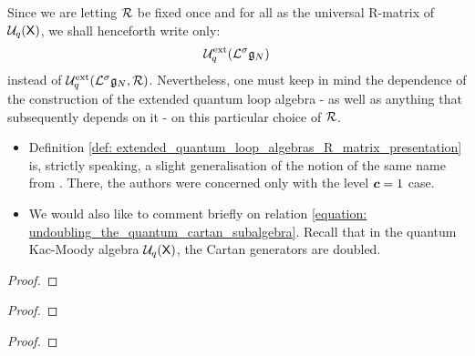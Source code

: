         \begin{convention}
            Since we are letting $\mathcal{R}$ be fixed once and for all as the universal R-matrix of $\mathcal{U}_q(\mathsf{X})$, we shall henceforth write only:
                $$\mathcal{U}_q^{\mathrm{ext}}(\mathcal{L}^{\sigma}\mathfrak{g}_N)$$
            instead of $\mathcal{U}_q^{\mathrm{ext}}(\mathcal{L}^{\sigma}\mathfrak{g}_N, \mathcal{R})$. Nevertheless, one must keep in mind the dependence of the construction of the extended quantum loop algebra - as well as anything that subsequently depends on it - on this particular choice of $\mathcal{R}$.
        \end{convention}
        \begin{remark}
            \begin{itemize}
                \item Definition \ref{def: extended_quantum_loop_algebras_R_matrix_presentation} is, strictly speaking, a slight generalisation of the notion of the same name from \cite{guay_regelskis_wendlandt_R_matrix_presentation_of_quantum_loop_algebras}. There, the authors were concerned only with the level $\boldsymbol{c} = 1$ case.
                \item We would also like to comment briefly on relation \eqref{equation: undoubling_the_quantum_cartan_subalgebra}. Recall that in the  quantum Kac-Moody algebra $\mathcal{U}_q(\mathsf{X})$, the Cartan generators are doubled. 
            \end{itemize}
        \end{remark}

        \begin{lemma}
            
        \end{lemma}
            \begin{proof}
                
            \end{proof}
        \begin{definition} \label{def: quantum_loop_algebras_R_matrix_presentation}
            
        \end{definition}

        \begin{lemma} \label{lemma: hopf_structure_on_extended_quantum_loop_algebras}
            
        \end{lemma}
            \begin{proof}
                
            \end{proof}
        \begin{corollary} \label{coro: hopf_structure_on_quantum_loop_algebras}
            
        \end{corollary}
            \begin{proof}
                
            \end{proof}

